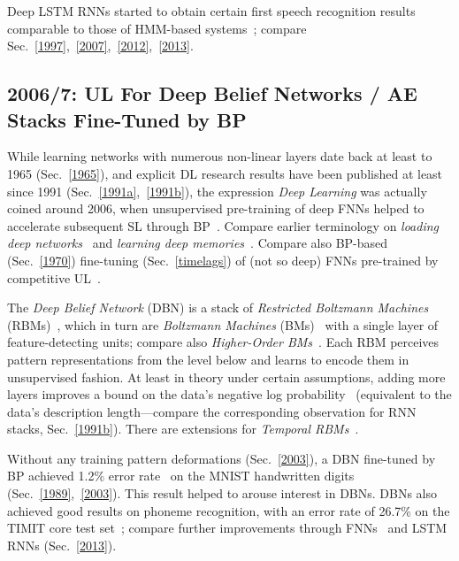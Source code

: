 \documentclass[letterpaper]{article}
\begin{document}
\begin{CJK*}{UTF8}{gbsn}
\begin{sloppypar}
Deep LSTM RNNs started to obtain certain first speech recognition results comparable to those of 
HMM-based systems~\citep{graves+eck+beringer+schmidhuber:2003}; compare Sec.~\ref{1997},~\ref{2007},~\ref{2012},~\ref{2013}. 




\subsection{2006/7: UL For Deep Belief Networks  / AE Stacks Fine-Tuned by BP}
\label{2006}

While learning networks with numerous non-linear layers
date back at least to 1965 (Sec.~\ref{1965}),
and explicit DL research results have been published at least since 1991 (Sec.~\ref{1991a},~\ref{1991b}), 
the expression {\em Deep Learning}  was actually 
coined around 2006, 
when   unsupervised pre-training of deep FNNs helped 
to accelerate subsequent SL through BP~\citep{HinSal06,hinton:06afast}.
Compare earlier terminology on {\em loading deep networks}~\citep{sima1994,windisch2005} 
and {\em learning deep memories}~\citep{Gomez:05gecco}. 
Compare also BP-based (Sec.~\ref{1970}) fine-tuning (Sec.~\ref{timelags}) of (not so deep) FNNs 
pre-trained by competitive UL~\citep{maclin1995}.

The {\em Deep Belief Network} (DBN) is a  
stack of {\em Restricted Boltzmann Machines} (RBMs)~\citep{smolensky86}, 
which in turn are {\em Boltzmann Machines} (BMs)~\citep{HintonSejnowski:86} 
with a single layer of feature-detecting units;
compare also {\em Higher-Order BMs}~\citep{memisevic2010}.
Each RBM perceives pattern representations from the level below and learns to encode
them in unsupervised fashion.
At least in theory under certain assumptions, 
adding more layers improves a bound on the data's negative log probability~\citep{hinton:06afast} 
(equivalent to the data's 
description length---compare the corresponding observation for RNN stacks, Sec.~\ref{1991b}).  
There are extensions for {\em Temporal RBMs}~\citep{sutskever2008}.


Without any training pattern deformations (Sec.~\ref{2003}),
a DBN fine-tuned by BP
achieved 1.2\% error rate~\citep{HinSal06} on the MNIST handwritten digits
(Sec.~\ref{1989},~\ref{2003}).
This result 
helped to arouse interest in DBNs. 
DBNs  also achieved good results on phoneme recognition,
with an error rate of 26.7\% on the
TIMIT core test set~\citep{mohamed2010};
compare further improvements through FNNs~\citep{speech2012,lideng2014}
and LSTM RNNs (Sec.~\ref{2013}).  


\end{sloppypar}
\end{CJK*}
\end{document}
